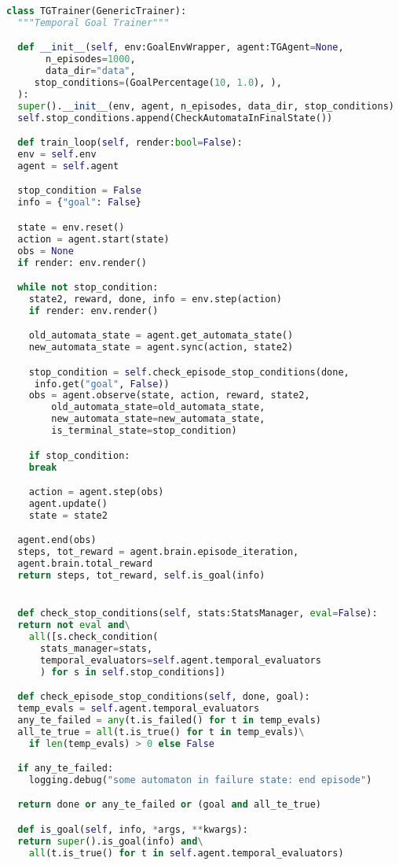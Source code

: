\begin{lstlisting}[style=Python, language=Python, escapechar=£, label={code:temporalGoalTrainer}, caption={\texttt{TGTrainer}}]
class TGTrainer(GenericTrainer):
  """Temporal Goal Trainer"""

  def __init__(self, env:GoalEnvWrapper, agent:TGAgent=None,
       n_episodes=1000,
       data_dir="data",
     stop_conditions=(GoalPercentage(10, 1.0), ),
  ):
  super().__init__(env, agent, n_episodes, data_dir, stop_conditions)
  self.stop_conditions.append(CheckAutomataInFinalState())

  def train_loop(self, render:bool=False):
  env = self.env
  agent = self.agent

  stop_condition = False
  info = {"goal": False}

  state = env.reset()
  action = agent.start(state)
  obs = None
  if render: env.render()

  while not stop_condition:
    state2, reward, done, info = env.step(action)
    if render: env.render()

    old_automata_state = agent.get_automata_state()
    new_automata_state = agent.sync(action, state2)

    stop_condition = self.check_episode_stop_conditions(done,
     info.get("goal", False))
    obs = agent.observe(state, action, reward, state2,
        old_automata_state=old_automata_state,
        new_automata_state=new_automata_state,
        is_terminal_state=stop_condition)

    if stop_condition:
    break

    action = agent.step(obs)
    agent.update()
    state = state2

  agent.end(obs)
  steps, tot_reward = agent.brain.episode_iteration,
  agent.brain.total_reward
  return steps, tot_reward, self.is_goal(info)


  def check_stop_conditions(self, stats:StatsManager, eval=False):
  return not eval and\
    all([s.check_condition(
      stats_manager=stats,
      temporal_evaluators=self.agent.temporal_evaluators
      ) for s in self.stop_conditions])

  def check_episode_stop_conditions(self, done, goal):
  temp_evals = self.agent.temporal_evaluators
  any_te_failed = any(t.is_failed() for t in temp_evals)
  all_te_true = all(t.is_true() for t in temp_evals)\
    if len(temp_evals) > 0 else False

  if any_te_failed:
    logging.debug("some automaton in failure state: end episode")

  return done or any_te_failed or (goal and all_te_true)

  def is_goal(self, info, *args, **kwargs):
  return super().is_goal(info) and\
    all(t.is_true() for t in self.agent.temporal_evaluators)

\end{lstlisting}

